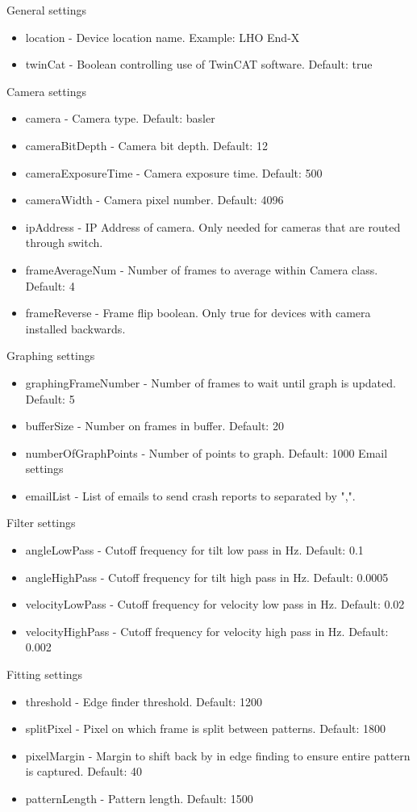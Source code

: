 \documentclass{article}
\begin{document}
General settings
\begin{itemize}
\item location - Device location name. Example: LHO End-X
\item twinCat - Boolean controlling use of TwinCAT software. Default: true
\end{itemize}
Camera settings
\begin{itemize}
\item camera - Camera type. Default: basler
\item cameraBitDepth - Camera bit depth. Default: 12
\item cameraExposureTime - Camera exposure time. Default: 500
\item cameraWidth - Camera pixel number. Default: 4096
\item ipAddress - IP Address of camera. Only needed for cameras that are routed through switch.
\item frameAverageNum - Number of frames to average within Camera class. Default: 4
\item frameReverse - Frame flip boolean. Only true for devices with camera installed backwards.
\end{itemize}
Graphing settings
\begin{itemize}
\item graphingFrameNumber - Number of frames to wait until graph is updated. Default: 5
\item bufferSize - Number on frames in buffer. Default: 20
\item numberOfGraphPoints - Number of points to graph. Default: 1000
Email settings
\item emailList - List of emails to send crash reports to separated by ",".
\end{itemize}
Filter settings
\begin{itemize}
\item angleLowPass - Cutoff frequency for tilt low pass in Hz. Default: 0.1
\item angleHighPass - Cutoff frequency for tilt high pass in Hz. Default: 0.0005
\item velocityLowPass - Cutoff frequency for velocity low pass in Hz. Default: 0.02
\item velocityHighPass - Cutoff frequency for velocity high pass in Hz. Default: 0.002
\end{itemize}
Fitting settings
\begin{itemize}
\item threshold - Edge finder threshold. Default: 1200
\item splitPixel - Pixel on which frame is split between patterns. Default: 1800
\item pixelMargin - Margin to shift back by in edge finding to ensure entire pattern is captured. Default: 40
\item patternLength - Pattern length. Default: 1500
\end{itemize}
\end{document}
